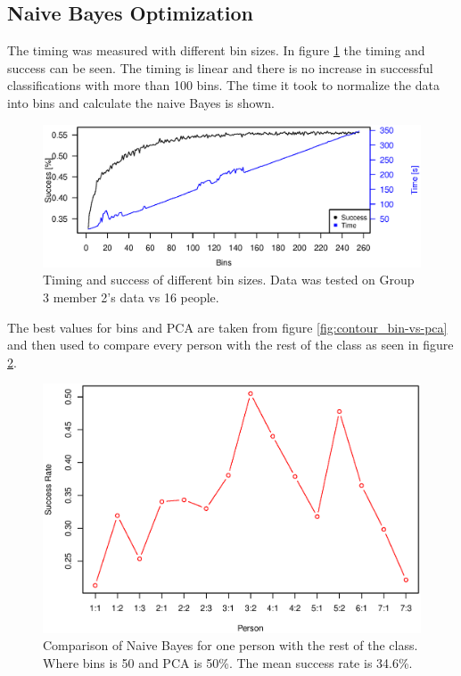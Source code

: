 \subsection{Naive Bayes Optimization}

The timing was measured with different bin sizes. 
In figure \ref{fig:baye_timing} the timing and success can be seen.
The timing is linear and there is no increase in successful classifications with more than 100 bins. 
The time it took to normalize the data into bins and calculate the naive Bayes is shown.

\begin{figure}[H]
\centering
\includegraphics[width = \textwidth]{graphics/baye_timing_bins}
\caption[Timing with different bin sizes]{Timing and success of different bin sizes. Data was tested on Group 3 member 2's data vs 16 people.}
\label{fig:baye_timing}
\end{figure}


The best values for bins and PCA are taken from figure \ref{fig:contour_bin-vs-pca} and then used to compare every person with the rest of the class as seen in figure \ref{fig:comp_naiveBayes}.

\begin{figure}[H]
\centering
\includegraphics[width = \textwidth]{graphics/graph_baye_comparison}
\caption{Comparison of Naive Bayes for one person with the rest of the class.
Where bins is 50 and PCA is 50\%. The mean success rate is 34.6\%.}
\label{fig:comp_naiveBayes}
\end{figure}

